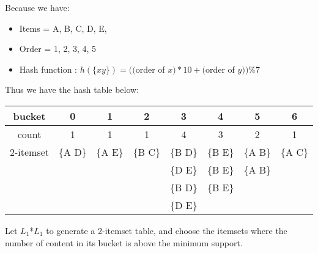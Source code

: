 \documentclass[en,black,normal,10pt]{elegantnote}
\begin{document}

Because we have:

\begin{itemize}
  \item Items = A, B, C, D, E,
  \item Order = 1, 2, 3, 4, 5
  \item Hash function : $h(\{x y\}) = (($order of $x)*10+($order of $y)) \% 7$
\end{itemize}

Thus we have the hash table below:

\begin{tabular}{|c|c|c|c|c|c|c|c|}
  \hline
    \rowcolor{Gray} %
    bucket & 0 & 1 & 2 & 3 & 4 & 5 & 6 \\
    \hline
    count & 1 & 1 & 1 & 4 & 3 & 2 & 1 \\
    \hline
    2-itemset & \{A D\} & \{A E\} & \{B C\} & \{B D\} & \{B E\} & \{A B\} & \{A C\} \\
    &  &  &  & \{D E\} & \{B E\} & \{A B\} & \\
    &  &  &  & \{B D\} & \{B E\} &  &  \\
    &  &  &  & \{D E\} &  &  &  \\
    \hline
\end{tabular}

Let $L_1$*$L_1$ to generate a 2-itemset table, and choose the itemsets where the number of content in its bucket is above the minimum support.
\end{document}
